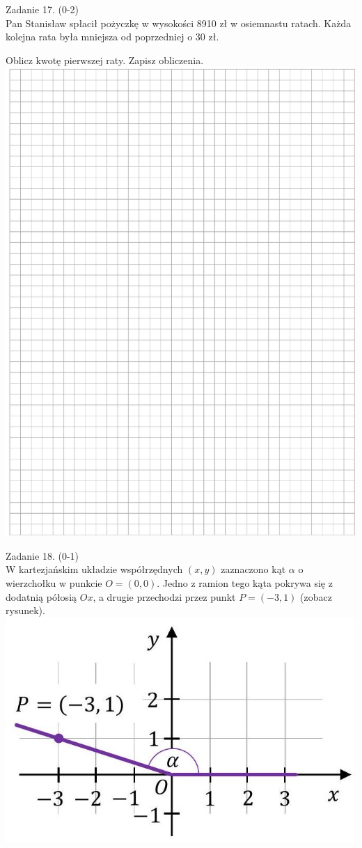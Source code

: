 \documentclass[10pt]{article}
\begin{document}
Zadanie 17. (0-2)\\
Pan Stanisław spłacił pożyczkę w wysokości 8910 zł w osiemnastu ratach. Każda kolejna rata była mniejsza od poprzedniej o 30 zł.

Oblicz kwotę pierwszej raty. Zapisz obliczenia.\\
\includegraphics[max width=\textwidth, center]{2024_11_21_51cb67544fb9b029f01cg-16}

Zadanie 18. (0-1)\\
W kartezjańskim układzie współrzędnych \((x, y)\) zaznaczono kąt \(\alpha\) o wierzchołku w punkcie \(O=(0,0)\). Jedno z ramion tego kąta pokrywa się z dodatnią półosią \(O x\), a drugie przechodzi przez punkt \(P=(-3,1)\) (zobacz rysunek).\\
\includegraphics[max width=\textwidth, center]{2024_11_21_51cb67544fb9b029f01cg-17(2)}
\end{document}
